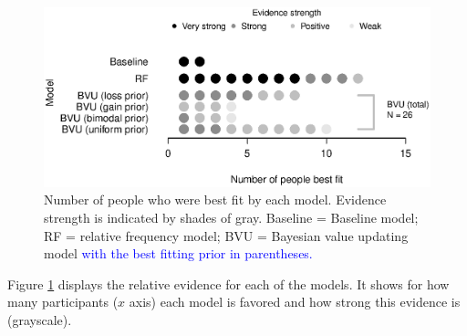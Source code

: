 \documentclass[a4paper, man, natbib, floatsintext]{apa6} %
\begin{document}

\begin{figure}[htbp] 
  \centering
\includegraphics[width=.9\linewidth, keepaspectratio]{modelcomp_rs1.eps}
  \caption{Number of people who were best fit by each model. Evidence strength is indicated by shades of gray. Baseline = Baseline model; RF = relative frequency model; BVU = Bayesian value updating model \textcolor{blue}{ with the best fitting prior in parentheses.} }
  \label{fig:modeling1}
\end{figure}
Figure \ref{fig:modeling1} displays the relative evidence for each of the models. It shows for how many participants ($x$ axis) each model is favored and how strong this evidence is (grayscale). 
\end{document}
